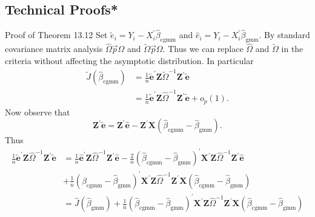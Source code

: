 \documentclass[10pt]{article}
\begin{document}
\subsection{Technical Proofs*}
Proof of Theorem 13.12 Set $\widetilde{e}_{i}=Y_{i}-X_{i}^{\prime} \widehat{\beta}_{\mathrm{cgmm}}$ and $\widehat{e}_{i}=Y_{i}-X_{i}^{\prime} \widehat{\beta}_{\mathrm{gmm}}$. By standard covariance matrix analysis $\widehat{\Omega} \vec{p} \Omega$ and $\widetilde{\Omega} \vec{p} \Omega$. Thus we can replace $\widehat{\Omega}$ and $\widetilde{\Omega}$ in the criteria without affecting the asymptotic distribution. In particular
$$
\begin{aligned}
\widetilde{J}\left(\widehat{\beta}_{\mathrm{cgmm}}\right) &=\frac{1}{n} \widetilde{\boldsymbol{e}}^{\prime} \boldsymbol{Z} \widetilde{\Omega}^{-1} \boldsymbol{Z}^{\prime} \widetilde{\boldsymbol{e}} \\
&=\frac{1}{n} \widetilde{\boldsymbol{e}}^{\prime} \boldsymbol{Z} \widehat{\Omega}^{-1} \boldsymbol{Z}^{\prime} \widetilde{\boldsymbol{e}}+o_{p}(1) .
\end{aligned}
$$
Now observe that
$$
\boldsymbol{Z}^{\prime} \widetilde{\boldsymbol{e}}=\boldsymbol{Z}^{\prime} \widehat{\boldsymbol{e}}-\boldsymbol{Z}^{\prime} \boldsymbol{X}\left(\widehat{\beta}_{\mathrm{cgmm}}-\widehat{\beta}_{\mathrm{gmm}}\right) .
$$
Thus
$$
\begin{aligned}
\frac{1}{n} \widetilde{\boldsymbol{e}}^{\prime} \boldsymbol{Z} \widehat{\Omega}^{-1} \boldsymbol{Z}^{\prime} \widetilde{\boldsymbol{e}} &=\frac{1}{n} \widehat{\boldsymbol{e}}^{\prime} \boldsymbol{Z} \widehat{\Omega}^{-1} \boldsymbol{Z}^{\prime} \widehat{\boldsymbol{e}}-\frac{2}{n}\left(\widehat{\beta}_{\mathrm{cgmm}}-\widehat{\beta}_{\mathrm{gmm}}\right)^{\prime} \boldsymbol{X}^{\prime} \boldsymbol{Z} \widehat{\Omega}^{-1} \boldsymbol{Z}^{\prime} \widehat{\boldsymbol{e}} \\
&+\frac{1}{n}\left(\widehat{\beta}_{\mathrm{cgmm}}-\widehat{\beta}_{\mathrm{gmm}}\right)^{\prime} \boldsymbol{X}^{\prime} \boldsymbol{Z} \widehat{\Omega}^{-1} \boldsymbol{Z}^{\prime} \boldsymbol{X}\left(\widehat{\beta}_{\mathrm{cgmm}}-\widehat{\beta}_{\mathrm{gmm}}\right) \\
&=\widehat{J}\left(\widehat{\beta}_{\mathrm{gmm}}\right)+\frac{1}{n}\left(\widehat{\beta}_{\mathrm{cgmm}}-\widehat{\beta}_{\mathrm{gmm}}\right)^{\prime} \boldsymbol{X}^{\prime} \boldsymbol{Z} \widehat{\Omega}^{-1} \boldsymbol{Z}^{\prime} \boldsymbol{X}\left(\widehat{\beta}_{\mathrm{cgmm}}-\widehat{\beta}_{\mathrm{gmm}}\right)
\end{aligned}
$$
\end{document}
